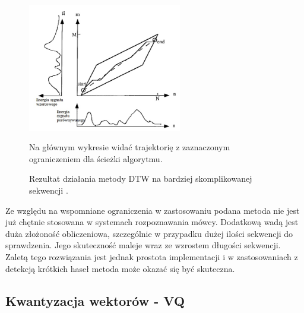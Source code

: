 \begin{figure}[ht!]
  \centering
    \includegraphics[width=0.6\textwidth]{dtwspeech.jpg}
    \caption{\label{dtwspeech}Rezultat działania metody DTW na bardziej skomplikowanej sekwencji \cite{campbell}.} Na głównym wykresie widać trajektorię z zaznaczonym ograniczeniem dla ścieżki algorytmu.
\end{figure}
Ze względu na wspomniane ograniczenia w zastosowaniu podana metoda nie jest już chętnie stosowana w systemach rozpoznawania mówcy. Dodatkową wadą jest duża złożoność obliczeniowa, szczególnie w przypadku dużej ilości sekwencji do sprawdzenia. Jego skuteczność maleje wraz ze wzrostem długości sekwencji. Zaletą tego rozwiązania jest jednak prostota implementacji i w zastosowaniach z detekcją krótkich haseł metoda może okazać się być skuteczna.

\subsection{Kwantyzacja wektorów - VQ}
\label{vq}

